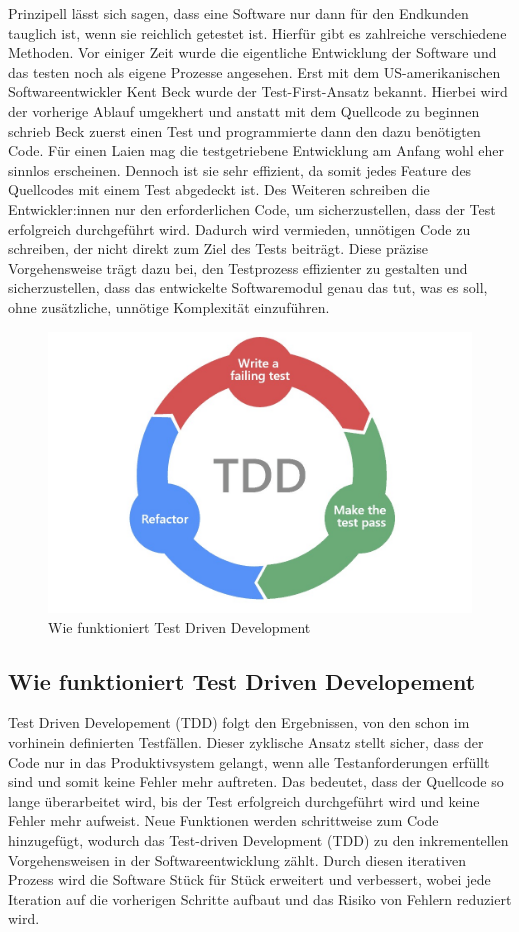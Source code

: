 Prinzipell lässt sich sagen, dass eine Software nur dann für den Endkunden tauglich ist, wenn sie reichlich getestet ist. Hierfür gibt es zahlreiche verschiedene Methoden. Vor einiger Zeit wurde die eigentliche Entwicklung der Software und das testen noch als eigene Prozesse angesehen. Erst mit dem US-amerikanischen Softwareentwickler Kent Beck wurde der Test-First-Ansatz bekannt. Hierbei wird der vorherige Ablauf umgekhert und anstatt mit dem Quellcode zu beginnen schrieb Beck zuerst einen Test und programmierte dann den dazu benötigten Code. Für einen Laien mag die testgetriebene Entwicklung am Anfang wohl eher sinnlos erscheinen. Dennoch ist sie sehr effizient, da somit jedes Feature des Quellcodes mit einem Test abgedeckt ist. Des Weiteren schreiben die Entwickler:innen nur den erforderlichen Code, um sicherzustellen, dass der Test erfolgreich durchgeführt wird. Dadurch wird vermieden, unnötigen Code zu schreiben, der nicht direkt zum Ziel des Tests beiträgt. Diese präzise Vorgehensweise trägt dazu bei, den Testprozess effizienter zu gestalten und sicherzustellen, dass das entwickelte Softwaremodul genau das tut, was es soll, ohne zusätzliche, unnötige Komplexität einzuführen.

\begin{figure}
    \centering
    \includegraphics[width=0.5\linewidth]{pics/tdd.jpeg}
    \caption{Wie funktioniert Test Driven Development}
    \label{fig:enter-label}
\end{figure}

\subsection{Wie funktioniert Test Driven Developement}

Test Driven Developement (TDD) folgt den Ergebnissen, von den schon im vorhinein definierten Testfällen. Dieser zyklische Ansatz stellt sicher, dass der Code nur in das Produktivsystem gelangt, wenn alle Testanforderungen erfüllt sind und somit keine Fehler mehr auftreten. Das bedeutet, dass der Quellcode so lange überarbeitet wird, bis der Test erfolgreich durchgeführt wird und keine Fehler mehr aufweist. Neue Funktionen werden schrittweise zum Code hinzugefügt, wodurch das Test-driven Development (TDD) zu den inkrementellen Vorgehensweisen in der Softwareentwicklung zählt. Durch diesen iterativen Prozess wird die Software Stück für Stück erweitert und verbessert, wobei jede Iteration auf die vorherigen Schritte aufbaut und das Risiko von Fehlern reduziert wird.

\cite{Was_ist_TDD}

